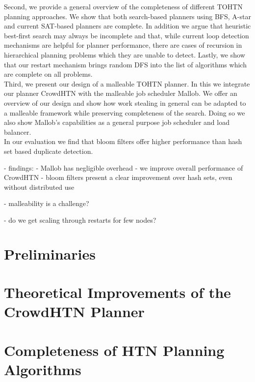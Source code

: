 \documentclass[enabledeprecatedfontcommands,12pt,a4paper,twoside]{scrartcl}
\numberwithin{equation}{section}
\begin{document}
Second, we provide a general overview of the completeness of different TOHTN planning approaches. We show that both search-based planners using BFS, A-star and current SAT-based planners are complete. In addition we argue that heuristic best-first search may always be incomplete and that, while current loop detection mechanisms are helpful for planner performance, there are cases of recursion in hierarchical planning problems which they are unable to detect. Lastly, we show that our restart mechanism brings random DFS into the list of algorithms which are complete on all problems. \\
Third, we present our design of a malleable TOHTN planner. In this we integrate our planner CrowdHTN with the malleable job scheduler Mallob. We offer an overview of our design and show how work stealing in general can be adapted to a malleable framework while preserving completeness of the search. Doing so we also show Mallob's capabilities as a general purpose job scheduler and load balancer.\\
In our evaluation we find that bloom filters offer higher performance than hash set based duplicate detection.


- findings:
	- Mallob has negligible overhead
	- we improve overall performance of CrowdHTN
	- bloom filters present a clear improvement over hash sets, even without distributed use
	
	- malleability is a challenge?

- do we get scaling through restarts for few nodes?
	
\clearpage
\pagebreak
\section{Preliminaries}








\clearpage
\pagebreak
\section{Theoretical Improvements of the CrowdHTN Planner}



\pagebreak
\section{Completeness of HTN Planning Algorithms}
\label{improv: completeness}

\clearpage
\pagebreak
\end{document}
